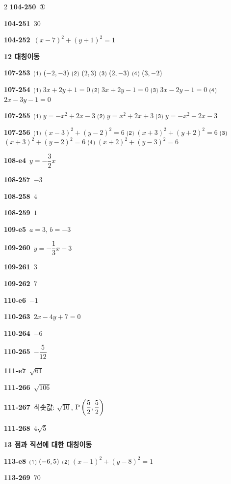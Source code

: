 \documentclass[10pt,a4paper]{article}
\newcommand{\pt}[1]{\mathrm{#1}}
\begin{document}
\begin{multicols}{2}
\noindent\textbf{104-250}\ ①\par
\noindent\textbf{104-251}\ $30$\par
\noindent\textbf{104-252}\ $(x-7)^2+(y+1)^2=1$\par
\noindent\textbf{12 대칭이동}\par\smallskip
\noindent\textbf{107-253}\ ⑴ $(-2{,}\mkern3mu\mathopen{}-3)$ ⑵ $(2{,}\mkern3mu\mathopen{}3)$ ⑶ $(2{,}\mkern3mu\mathopen{}-3)$ ⑷ $(3{,}\mkern3mu\mathopen{}-2)$\par
\noindent\textbf{107-254}\ ⑴ $3x+2y+1=0$ ⑵ $3x+2y-1=0$ ⑶ $3x-2y-1=0$ ⑷ $2x-3y-1=0$\par
\noindent\textbf{107-255}\ ⑴ $y=-x^2+2x-3$ ⑵ $y=x^2+2x+3$ ⑶ $y=-x^2-2x-3$\par
\noindent\textbf{107-256}\ ⑴ $(x-3)^2+(y-2)^2=6$ ⑵ $(x+3)^2+(y+2)^2=6$ ⑶ $(x+3)^2+(y-2)^2=6$ ⑷ $(x+2)^2+(y-3)^2=6$\par
\noindent\textbf{108-e4}\ $y=-\dfrac{3}{2}x$\par
\noindent\textbf{108-257}\ $-3$\par
\noindent\textbf{108-258}\ $4$\par
\noindent\textbf{108-259}\ $1$\par
\noindent\textbf{109-e5}\ $a=3$, $b=-3$\par
\noindent\textbf{109-260}\ $y=-\dfrac{1}{3}x+3$\par
\noindent\textbf{109-261}\ $3$\par
\noindent\textbf{109-262}\ $7$\par
\noindent\textbf{110-e6}\ $-1$\par
\noindent\textbf{110-263}\ $2x-4y+7=0$\par
\noindent\textbf{110-264}\ $-6$\par
\noindent\textbf{110-265}\ $-\dfrac{5}{12}$\par
\noindent\textbf{111-e7}\ $\sqrt{61}$\par
\noindent\textbf{111-266}\ $\sqrt{106}$\par
\noindent\textbf{111-267}\ 최솟값: $\sqrt{10}$, $\pt{P}\left(\dfrac{5}{2}{,}\mkern3mu\mathopen{}\dfrac{5}{2}\right)$\par
\noindent\textbf{111-268}\ $4\sqrt{5}$\par
\noindent\textbf{13 점과 직선에 대한 대칭이동}\par\smallskip
\noindent\textbf{113-e8}\ ⑴ $(-6{,}\mkern3mu\mathopen{}5)$ ⑵ $(x-1)^2+(y-8)^2=1$\par
\noindent\textbf{113-269}\ $70$\par

\end{multicols}
\end{document}

